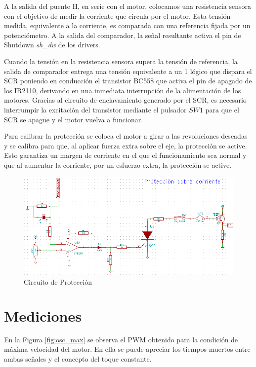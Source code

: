 \documentclass[11pt, a4paper]{article}
\begin{document}
A la salida del puente H, en serie con el motor, colocamos una resistencia sensora con el objetivo de medir la corriente que circula por el motor. Esta tensión medida, equivalente a la corriente, es comparada con una referencia fijada por un potenciómetro. A la salida del comparador, la señal resultante activa el pin de Shutdown \textit{sh\_dw} de los drivers.

Cuando la tensión en la resistencia sensora supera la tensión de referencia, la salida de comparador entrega una tensión equivalente a un 1 lógico que dispara el SCR poniendo en conducción el transistor BC558 que activa el pin de apagado de los IR2110, derivando en una inmediata interrupción de la alimentación de los motores. Gracias al circuito de enclavamiento generado por el SCR, es necesario interrumpir la excitación del transistor mediante el pulsador $SW1$ para que el SCR se apague y el motor vuelva a funcionar.

Para calibrar la protección se coloca el motor a girar a las revoluciones deseadas y se calibra para que, al aplicar fuerza extra sobre el eje, la protección se active. Esto garantiza un margen de corriente en el que el funcionamiento sea normal y que al aumentar la corriente, por un esfuerzo extra, la protección se active.


\begin{figure}[h]
	\centering
	\includegraphics[width=13cm]{Imagenes/circ_prot.png}
	\caption{Circuito de Protección}
	\label{fig:circ_protecc}
\end{figure} 

\section{Mediciones}

En la Figura \ref{fig:osc_max} se observa el PWM obtenido para la condición de máxima velocidad del motor. En ella se puede apreciar los tiempos muertos entre ambas señales y el concepto del toque constante. 
\end{document}
